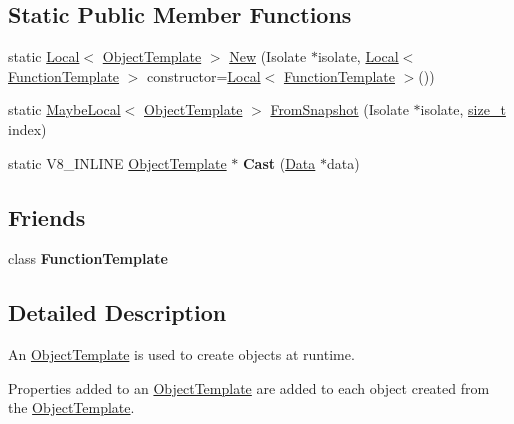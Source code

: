 \subsection*{Static Public Member Functions}
\begin{DoxyCompactItemize}
\item 
static \mbox{\hyperlink{classv8_1_1Local}{Local}}$<$ \mbox{\hyperlink{classv8_1_1ObjectTemplate}{Object\+Template}} $>$ \mbox{\hyperlink{classv8_1_1ObjectTemplate_a092e8adf656359d4dead412d28313ebb}{New}} (Isolate $\ast$isolate, \mbox{\hyperlink{classv8_1_1Local}{Local}}$<$ \mbox{\hyperlink{classv8_1_1FunctionTemplate}{Function\+Template}} $>$ constructor=\mbox{\hyperlink{classv8_1_1Local}{Local}}$<$ \mbox{\hyperlink{classv8_1_1FunctionTemplate}{Function\+Template}} $>$())
\item 
static \mbox{\hyperlink{classv8_1_1MaybeLocal}{Maybe\+Local}}$<$ \mbox{\hyperlink{classv8_1_1ObjectTemplate}{Object\+Template}} $>$ \mbox{\hyperlink{classv8_1_1ObjectTemplate_a9cc34e327042bba1ae61cf3307a7395e}{From\+Snapshot}} (Isolate $\ast$isolate, \mbox{\hyperlink{classsize__t}{size\+\_\+t}} index)
\item 
\mbox{\label{classv8_1_1ObjectTemplate_aba82061a19144380f44994c3e57c6e60}} 
static V8\+\_\+\+I\+N\+L\+I\+NE \mbox{\hyperlink{classv8_1_1ObjectTemplate}{Object\+Template}} $\ast$ {\bfseries Cast} (\mbox{\hyperlink{classv8_1_1Data}{Data}} $\ast$data)
\end{DoxyCompactItemize}
\subsection*{Friends}
\begin{DoxyCompactItemize}
\item 
\mbox{\label{classv8_1_1ObjectTemplate_a334168ad1a5f39cf17b818ca3356aacd}} 
class {\bfseries Function\+Template}
\end{DoxyCompactItemize}


\subsection{Detailed Description}
An \mbox{\hyperlink{classv8_1_1ObjectTemplate}{Object\+Template}} is used to create objects at runtime.

Properties added to an \mbox{\hyperlink{classv8_1_1ObjectTemplate}{Object\+Template}} are added to each object created from the \mbox{\hyperlink{classv8_1_1ObjectTemplate}{Object\+Template}}. 

